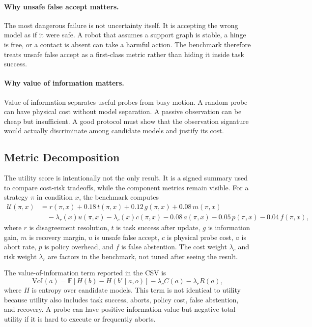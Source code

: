\documentclass{article}
\newcommand{\utility}{\mathcal{U}}
\newcommand{\voi}{\mathrm{VoI}}
\begin{document}
\paragraph{Why unsafe false accept matters.}
The most dangerous failure is not uncertainty itself. It is accepting the wrong model as if it were safe. A robot that assumes a support graph is stable, a hinge is free, or a contact is absent can take a harmful action. The benchmark therefore treats unsafe false accept as a first-class metric rather than hiding it inside task success.

\paragraph{Why value of information matters.}
Value of information separates useful probes from busy motion. A random probe can have physical cost without model separation. A passive observation can be cheap but insufficient. A good protocol must show that the observation signature would actually discriminate among candidate models and justify its cost.

\subsection{Metric Decomposition}

The utility score is intentionally not the only result. It is a signed summary used to compare cost-risk tradeoffs, while the component metrics remain visible. For a strategy $\pi$ in condition $x$, the benchmark computes
\[
\begin{aligned}
\utility(\pi,x)
&= r(\pi,x)
 + 0.18\,t(\pi,x)
 + 0.12\,g(\pi,x)
 + 0.08\,m(\pi,x) \\
&\quad
 - \lambda_r(x) u(\pi,x)
 - \lambda_c(x) c(\pi,x)
 - 0.08\,a(\pi,x)
 - 0.05\,p(\pi,x)
 - 0.04\,f(\pi,x),
\end{aligned}
\]
where $r$ is disagreement resolution, $t$ is task success after update, $g$ is information gain, $m$ is recovery margin, $u$ is unsafe false accept, $c$ is physical probe cost, $a$ is abort rate, $p$ is policy overhead, and $f$ is false abstention. The cost weight $\lambda_c$ and risk weight $\lambda_r$ are factors in the benchmark, not tuned after seeing the result.

The value-of-information term reported in the CSV is
\[
    \voi(a) =
    \mathbb{E}\left[H(b)-H(b' \mid a,o)\right]
    - \lambda_c C(a)
    - \lambda_r R(a),
\]
where $H$ is entropy over candidate models. This term is not identical to utility because utility also includes task success, aborts, policy cost, false abstention, and recovery. A probe can have positive information value but negative total utility if it is hard to execute or frequently aborts.
\end{document}
